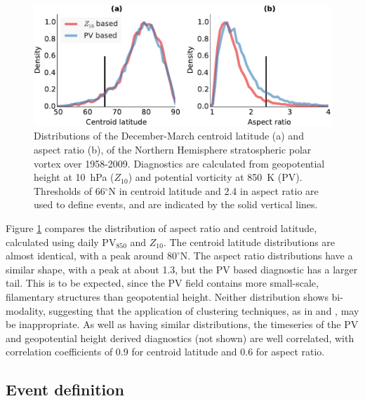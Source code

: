  \begin{figure}
 \centering 
\includegraphics[width=\textwidth]{figures/chapter-moments/moments_distribution_crop.pdf}
\caption[Distributions of $Z_{10}$ and PV-based moment
diagnostics.]{Distributions of the December-March centroid latitude (a) and
  aspect ratio (b), of the Northern Hemisphere stratospheric polar vortex over
  1958-2009. Diagnostics are calculated from geopotential height at 10~hPa
  ($Z_{10}$) and potential vorticity at 850~K (PV). Thresholds of 66$^{\circ}$N
  in centroid latitude and 2.4 in aspect ratio are used to define events, and
  are indicated by the solid vertical lines.}
 \label{Fig1}
 \end{figure}
 Figure \ref{Fig1} compares the distribution of aspect ratio and centroid
 latitude, calculated using daily PV$_{850}$ and $Z_{10}$. The centroid latitude
 distributions are almost identical, with a peak around $80^{\circ}$N. The
 aspect ratio distributions have a similar shape, with a peak at about 1.3, but
 the PV based diagnostic has a larger tail. This is to be expected, since the PV
 field contains more small-scale, filamentary structures than geopotential
 height. Neither distribution shows bi-modality, suggesting that the application
 of clustering techniques, as in \citet{K.Coughlin2009} and
 \citet{Hannachi2010}, may be inappropriate. As well as having similar
 distributions, the timeseries of the PV and geopotential height derived
 diagnostics (not shown) are well correlated, with correlation coefficients of
 0.9 for centroid latitude and 0.6 for aspect ratio.



\subsection{Event definition}

